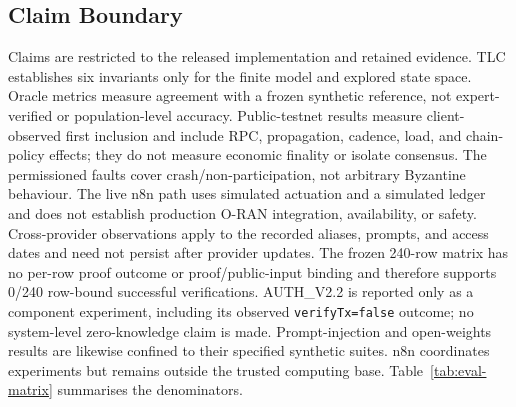 \documentclass[journal]{IEEEtran}
\begin{document}
\subsection{Claim Boundary}
\label{sec:claim-boundary}
Claims are restricted to the released implementation and retained evidence.
TLC establishes six invariants only for the finite model and explored state
space. Oracle metrics measure agreement with a frozen synthetic reference, not
expert-verified or population-level accuracy. Public-testnet results measure
client-observed first inclusion and include RPC, propagation, cadence, load,
and chain-policy effects; they do not measure economic finality or isolate
consensus. The permissioned faults cover crash/non-participation, not arbitrary
Byzantine behaviour. The live n8n path uses simulated actuation and a simulated
ledger and does not establish production O-RAN integration, availability, or
safety. Cross-provider observations apply to the recorded aliases, prompts,
and access dates and need not persist after provider updates.
The frozen 240-row matrix has no per-row proof outcome or
proof/public-input binding and therefore supports 0/240 row-bound successful
verifications. AUTH\_V2.2 is reported only as a component experiment,
including its observed \texttt{verifyTx=false} outcome; no system-level
zero-knowledge claim is made. Prompt-injection and open-weights results are
likewise confined to their specified synthetic suites. n8n coordinates
experiments but remains outside the trusted computing base.
Table~\ref{tab:eval-matrix} summarises the denominators.
\end{document}
